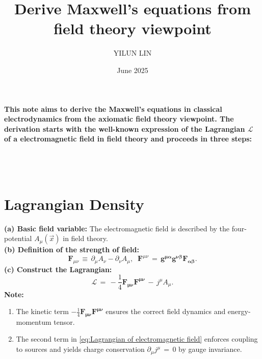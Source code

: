 \documentclass[11pt]{article}
\title{Derive Maxwell's equations from field theory viewpoint}
\author{YILUN LIN}
\date{June 2025}
\numberwithin{equation}{section}
\begin{document}
\maketitle
\textbf{This note aims to derive the Maxwell's equations in classical electrodynamics from the axiomatic field theory viewpoint. The derivation starts with the well-known expression of the Lagrangian $\mathcal{L}$ of a electromagnetic field in field theory and proceeds in three steps:}   \\
\\
\\
\\[1em]

\section{Lagrangian Density}
\textbf{(a) Basic field variable:}
The electromagnetic field is described by the four-potential $A_\mu(\Vec{x})$ in field theory.
\\[0.5em]
\textbf{(b) Definition of the strength of field:}
\begin{equation}\label{eq: def. field strength F}
   \mathbf F_{\mu\nu}\, \equiv \, \partial_\mu A_\nu-\partial_\nu A_\mu, \;\; 
   \mathbf F^{\mu\nu}\,=\,\mathbf{g^{\mu\alpha}g^{\nu\beta}F_{\alpha\beta}}.
\end{equation}
\textbf{(c) Construct the Lagrangian:}
\begin{equation}\label{eq:Lagrangian of electromagnetic field}
   \mathcal{L}\,=\,-\frac{1}{4} \mathbf{F_{\mu\nu}F^{\mu\nu}}\,-\,j^\mu A_\mu.
\end{equation}
\textbf{Note:}
\hspace{3em}\begin{enumerate}
\item The kinetic term $-\frac{1}{4}\mathbf{F_{\mu\nu}F^{\mu\nu}}$ ensures the correct field dynamics and energy-momentum tensor.\\
\item The second term in \eqref{eq:Lagrangian of electromagnetic field} enforces coupling to sources and yields charge conservation $\partial_\mu j^\mu\,=\,0$ by gauge invariance.
\end{enumerate}
\end{document}
